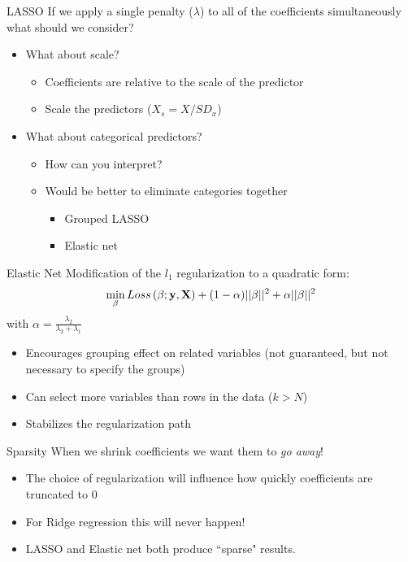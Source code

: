 \documentclass{beamer}\usepackage[]{graphicx}\usepackage[]{color}
\begin{document}
\begin{frame}{LASSO}
If we apply a single penalty ($\lambda$) to all of the coefficients simultaneously what should we consider?\\
\pause
\bigskip
\begin{itemize}
\item What about scale?
\pause
  \begin{itemize}
  \item Coefficients are relative to the scale of the predictor
  \item Scale the predictors ($X_s = X/SD_x$)
  \end{itemize}
\bigskip
\pause
\item What about categorical predictors?
\pause
  \begin{itemize}
  \item How can you interpret?
  \item Would be better to eliminate categories together
  \pause
    \begin{itemize}
    \item Grouped LASSO
    \item Elastic net
    \end{itemize}  
  \end{itemize}
\end{itemize}
\end{frame}

\begin{frame}{Elastic Net}
Modification of the $l_1$ regularization to a quadratic form:
$$\min_\beta Loss\left(\beta; \bf{y,X} \right) + (1-\alpha) ||\beta||^2 + \alpha ||\beta||^2$$
with $\alpha = \frac{\lambda_2}{\lambda_2 + \lambda_1}$
\begin{itemize}
\item Encourages grouping effect on related variables (not guaranteed, but not necessary to specify the groups)
\item Can select more variables than rows in the data ($k>N$)
\item Stabilizes the regularization path
\end{itemize}
\end{frame}

\begin{frame}{Sparsity}
When we shrink coefficients we want them to \emph{go away}!
\bigskip
\pause
\begin{itemize}
\item The choice of regularization will influence how quickly coefficients are truncated to 0
\item For Ridge regression this will never happen!
\item LASSO and Elastic net both produce ``sparse" results.
\end{itemize}
\end{frame}
\end{document}

